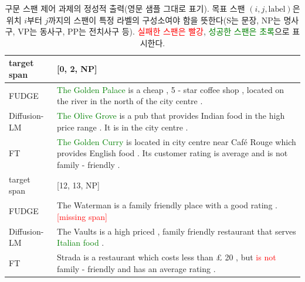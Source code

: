 \documentclass{article}
\newcommand\errorspan[1]{\textcolor{red}{#1}}
\newcommand\greenspan[1]{\textcolor{green}{#1}}
\begin{document}
\begin{table}
{\begin{tabular}{lp{13cm}}
\toprule
target span & [0, 2, NP]\\
\midrule
FUDGE & \greenspan{The Golden Palace} is a cheap , 5 - star coffee shop , located on the river in the north of the city centre . \\
Diffusion-LM & \greenspan{The Olive Grove} is a pub that provides Indian food in the high price range . It is in the city centre . \\
FT &  \greenspan{The Golden Curry} is located in city centre near Café Rouge which provides English food . Its customer rating is average and is not family - friendly . \\
\toprule
target span & [12, 13, NP]\\
\midrule
FUDGE & The Waterman is a family friendly place with a good rating .\errorspan{ [missing span]}\\
Diffusion-LM &   The Vaults is a high priced , family friendly restaurant that serves \greenspan{Italian food} . \\
FT &  Strada is a restaurant which costs less than £ 20 , but \errorspan{is not} family - friendly and has an average rating . \\
 
\bottomrule
\end{tabular}}
\caption{\label{app:qualitative-span} 구문 스팬 제어 과제의 정성적 출력(영문 샘플 그대로 표기). 목표 스팬 $(i,j,\text{label})$은 위치 $i$부터 $j$까지의 스팬이 특정 라벨의 구성소여야 함을 뜻한다(S는 문장, NP는 명사구, VP는 동사구, PP는 전치사구 등). \errorspan{실패한 스팬은 빨강}, \greenspan{성공한 스팬은 초록}으로 표시한다.}
\end{table}
\end{document}
